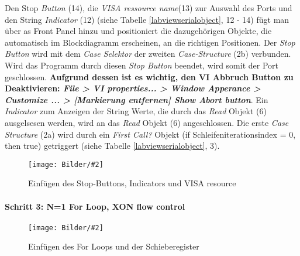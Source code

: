 \documentclass[
fontsize=12pt, 
paper=a4, 
BCOR=10mm, 
twoside=false,
 DIV=10, 
 headsepline, 
 footsepline
 ]{scrartcl}
\def\bild#1#2#3#4#5#6{%
\begin{figure}[h!] %
\centering
\texttt{[image: Bilder/\#2]}
\vspace{#3}
\caption[#4]{#5}\label{#6}
\end{figure}
}
\begin{document}
Den Stop \textit{Button} (14), die \textit{VISA ressource name}(13) zur Auswahl des Ports und den String \textit{Indicator} (12) (siehe Tabelle \ref{labviewserialobject}, 12 - 14) fügt man über as Front Panel hinzu und positioniert die dazugehörigen Objekte, die automatisch im Blockdiagramm erscheinen, an die richtigen Positionen. Der \textit{Stop Button} wird mit dem \textit{Case Selektor} der zweiten \textit{Case-Structure} (2b) verbunden. Wird das Programm durch diesen \textit{Stop Button} beendet, wird somit der Port geschlossen. \textbf{Aufgrund dessen ist es wichtig, den VI Abbruch Button zu Deaktivieren: \emph{File > VI properties... > Window Apperance > Customize ... > [Markierung entfernen] Show Abort button}}. Ein \textit{Indicator} zum Anzeigen der String Werte, die durch das \textit{Read} Objekt (6) ausgelsesen werden, wird an das \textit{Read} Objekt (6) angeschlossen. Die erste \textit{Case Structure} (2a) wird durch ein \textit{First Call?} Objekt (if Schleifeniterationsindex = 0, then true) getriggert (siehe Tabelle \ref{labviewserialobject}, 3).

\bild{1}
{LabVIEW_serialport/step_2_cases_buttons-indicators-controls_2.png}
{0em}
{Einfügen von Stop-button/Indicators/VISA resource}
{Einfügen des Stop-Buttons, Indicators und VISA resource}
{step2}

\paragraph{Schritt 3: N=1 For Loop, XON flow control}

\bild{1}
{LabVIEW_serialport/step_3_for-loop_add-shift-register_2.png}
{0em}
{Einfügen von For Loops/Schieberegister}
{Einfügen des For Loops und der Schieberegister}
{step3}
\end{document}
